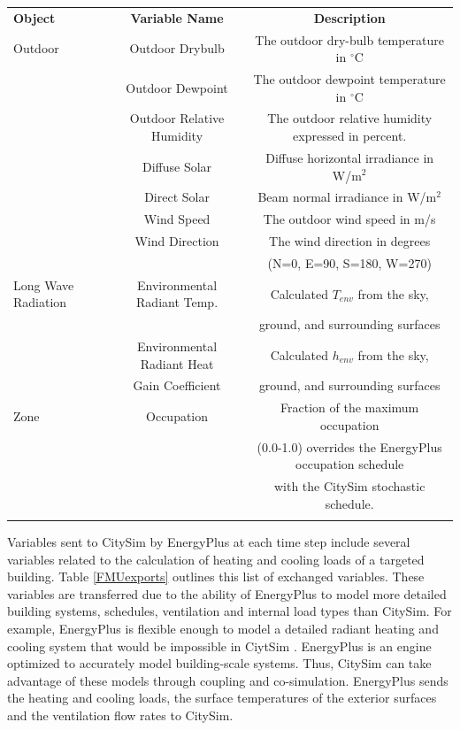 \documentclass{tBPS2e}
\theoremstyle{plain}
\theoremstyle{definition}
\theoremstyle{remark}
\begin{document}
\begin{table}[H]
{\begin{tabular}[l]{@{}lcc}\toprule
  \bf{Object} &  \bf{Variable Name} & \bf{Description} \\
\colrule
  Outdoor & Outdoor Drybulb & The outdoor dry-bulb temperature in $^{\circ}\mathrm{C}$ \\
 & Outdoor Dewpoint & The outdoor dewpoint temperature in $^{\circ}\mathrm{C}$ \\
 & Outdoor Relative Humidity & The outdoor relative humidity expressed in percent. \\
 & Diffuse Solar & Diffuse horizontal irradiance in W/m$^2$ \\
 & Direct Solar & Beam normal irradiance in W/m$^2$ \\
 & Wind Speed & The outdoor wind speed in m/s \\
 & Wind Direction & The wind direction in degrees\\&&  (N=0, E=90, S=180, W=270) \\
 \hline
 Long Wave Radiation & Environmental Radiant Temp. & Calculated $T_{env}$ from the sky,\\&& ground, and surrounding surfaces \\
 & Environmental Radiant Heat  & Calculated $h_{env}$ from the sky,\\
 & Gain Coefficient & ground, and surrounding surfaces \\
 
 \hline
Zone & Occupation & Fraction of the maximum occupation\\&& (0.0-1.0) overrides the EnergyPlus occupation schedule\\&&  with the CitySim stochastic schedule. \\
\botrule
\end{tabular}}
\label{FMUimports}
\end{table}

Variables sent to CitySim by EnergyPlus at each time step include several
variables related to the calculation of heating and cooling loads of a
targeted building. Table \ref{FMUexports} outlines this list of exchanged variables.
These variables are transferred due to the ability of
EnergyPlus to model more detailed building systems, schedules, ventilation and
internal load types than CitySim. For example, EnergyPlus is flexible enough
to model a detailed radiant heating and cooling system that would be
impossible in CiytSim \citep{barbara:2015tz}. EnergyPlus is an engine
optimized to accurately model building-scale systems. Thus, CitySim can take 
advantage of these models through coupling and co-simulation. EnergyPlus sends
the heating and cooling loads, the surface temperatures of the exterior
surfaces and the ventilation flow rates to CitySim.
\end{document}
